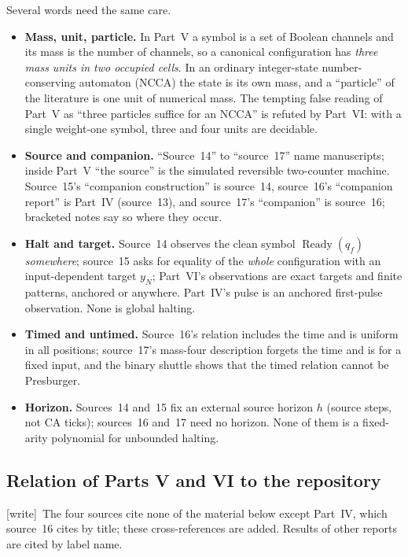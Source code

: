 \documentclass[11pt,letterpaper]{article}
\numberwithin{equation}{section}
\theoremstyle{definition}
\theoremstyle{remark}
\newcommand{\wtag}{\textup{[write]}}
\newcommand{\Ready}{\operatorname{Ready}}
\begin{document}
Several words need the same care.
\begin{itemize}
\item \textbf{Mass, unit, particle.} In Part~V a symbol is a set of Boolean channels and its mass is the number of channels, so a canonical configuration has \emph{three mass units in two occupied cells}. In an ordinary integer-state number-conserving automaton (NCCA) the state is its own mass, and a ``particle'' of the literature is one unit of numerical mass. The tempting false reading of Part~V as ``three particles suffice for an NCCA'' is refuted by Part~VI: with a single weight-one symbol, three and four units are decidable.
\item \textbf{Source and companion.} ``Source~14'' to ``source~17'' name manuscripts; inside Part~V ``the source'' is the simulated reversible two-counter machine. Source~15's ``companion construction'' is source~14, source~16's ``companion report'' is Part~IV (source~13), and source~17's ``companion'' is source~16; bracketed notes say so where they occur.
\item \textbf{Halt and target.} Source~14 observes the clean symbol $\Ready(q_f)$ \emph{somewhere}; source~15 asks for equality of the \emph{whole} configuration with an input-dependent target $y_N$; Part~VI's observations are exact targets and finite patterns, anchored or anywhere. Part~IV's pulse is an anchored first-pulse observation. None is global halting.
\item \textbf{Timed and untimed.} Source~16's relation includes the time and is uniform in all positions; source~17's mass-four description forgets the time and is for a fixed input, and the binary shuttle shows that the timed relation cannot be Presburger.
\item \textbf{Horizon.} Sources~14 and~15 fix an external source horizon $h$ (source steps, not CA ticks); sources~16 and~17 need no horizon. None of them is a fixed-arity polynomial for unbounded halting.
\end{itemize}

\subsection{Relation of Parts V and VI to the repository}\label{smc:tm:sec:relation}

\wtag\ The four sources cite none of the material below except Part~IV, which source~16 cites by title; these cross-references are added. Results of other reports are cited by label name.
\end{document}
